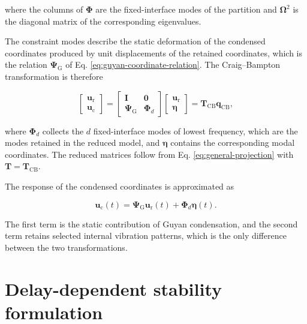 \documentclass[a4paper,fleqn,review,12pt]{cas-sc}
\numberwithin{equation}{section}
\begin{document}
\noindent where the columns of \(\bm{\Phi}\) are the fixed-interface modes of the partition and \(\bm{\Omega}^{2}\) is the diagonal matrix of the corresponding eigenvalues.

The constraint modes describe the static deformation of the condensed coordinates produced by unit displacements of the retained coordinates, which is the relation \(\bm{\Psi}_{\mathrm{G}}\) of Eq. \eqref{eq:guyan-coordinate-relation}. The Craig--Bampton transformation is therefore

\vspace{-3.5em}
\begin{equation}
	\begin{bmatrix}
		\bm{u}_{\mathrm{r}}\\
		\bm{u}_{\mathrm{c}}
	\end{bmatrix}
	=
	\begin{bmatrix}
		\mathbf{I} & \mathbf{0}\\
		\bm{\Psi}_{\mathrm{G}} & \bm{\Phi}_{d}
	\end{bmatrix}
	\begin{bmatrix}
		\bm{u}_{\mathrm{r}}\\
		\bm{\eta}
	\end{bmatrix}
	=
	\mathbf{T}_{\mathrm{CB}}\bm{q}_{\mathrm{CB}},
	\label{eq:cb-transformation}
\end{equation}
\vspace{-3.5em}

\noindent where \(\bm{\Phi}_{d}\) collects the \(d\) fixed-interface modes of lowest frequency, which are the modes retained in the reduced model, and \(\bm{\eta}\) contains the corresponding modal coordinates. The reduced matrices follow from Eq. \eqref{eq:general-projection} with \(\mathbf{T}=\mathbf{T}_{\mathrm{CB}}\).

The response of the condensed coordinates is approximated as

\vspace{-3.5em}
\begin{equation}
	\bm{u}_{\mathrm{c}}(t)=
	\bm{\Psi}_{\mathrm{G}}\bm{u}_{\mathrm{r}}(t)
	+\bm{\Phi}_{d}\bm{\eta}(t).
	\label{eq:cb-internal-recovery}
\end{equation}
\vspace{-3.5em}

The first term is the static contribution of Guyan condensation, and the second term retains selected internal vibration patterns, which is the only difference between the two transformations.


\section{Delay-dependent stability formulation} \label{sec3}
\end{document}
